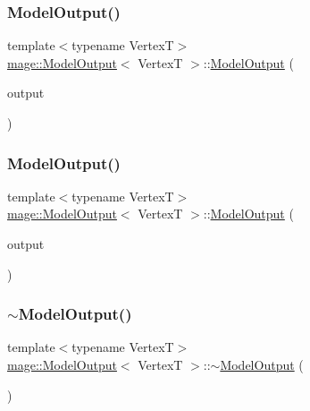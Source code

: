 \subsubsection{\texorpdfstring{Model\+Output()}{ModelOutput()}\hspace{0.1cm}{\footnotesize\ttfamily [2/3]}}
{\footnotesize\ttfamily template$<$typename VertexT$>$ \\
\hyperlink{structmage_1_1_model_output}{mage\+::\+Model\+Output}$<$ VertexT $>$\+::\hyperlink{structmage_1_1_model_output}{Model\+Output} (\begin{DoxyParamCaption}\item[{const \hyperlink{structmage_1_1_model_output}{Model\+Output}$<$ VertexT $>$ \&}]{output }\end{DoxyParamCaption})\hspace{0.3cm}{\ttfamily [delete]}}

\hypertarget{structmage_1_1_model_output_a20faa6e5b76ec7903a09e222e61e5353}{}\label{structmage_1_1_model_output_a20faa6e5b76ec7903a09e222e61e5353} 
\subsubsection{\texorpdfstring{Model\+Output()}{ModelOutput()}\hspace{0.1cm}{\footnotesize\ttfamily [3/3]}}
{\footnotesize\ttfamily template$<$typename VertexT$>$ \\
\hyperlink{structmage_1_1_model_output}{mage\+::\+Model\+Output}$<$ VertexT $>$\+::\hyperlink{structmage_1_1_model_output}{Model\+Output} (\begin{DoxyParamCaption}\item[{\hyperlink{structmage_1_1_model_output}{Model\+Output}$<$ VertexT $>$ \&\&}]{output }\end{DoxyParamCaption})\hspace{0.3cm}{\ttfamily [default]}}

\hypertarget{structmage_1_1_model_output_a69a7f27486ad287943cbf973107ad8e1}{}\label{structmage_1_1_model_output_a69a7f27486ad287943cbf973107ad8e1} 
\subsubsection{\texorpdfstring{$\sim$\+Model\+Output()}{~ModelOutput()}}
{\footnotesize\ttfamily template$<$typename VertexT$>$ \\
\hyperlink{structmage_1_1_model_output}{mage\+::\+Model\+Output}$<$ VertexT $>$\+::$\sim$\hyperlink{structmage_1_1_model_output}{Model\+Output} (\begin{DoxyParamCaption}{ }\end{DoxyParamCaption})\hspace{0.3cm}{\ttfamily [default]}}



